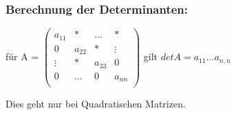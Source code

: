 \begin{framed} [Rechenregeln]
    \subsubsection*{Berechnung der Determinanten:}
      \begin{center}
        für A =
        $\begin{pmatrix}
          a_{11}  & *       & \dots   & *       \\
          0       & a_{22}  & *       & \vdots  \\
          \vdots  & *       & a_{33}  & 0       \\
          0       & \dots   & 0       & a_{nn}  \\
        \end{pmatrix}$
        gilt $detA = a_{11} \dots a_{n,n}$
      \end{center}
      Dies geht nur bei Quadratischen Matrizen.
\end{framed}
